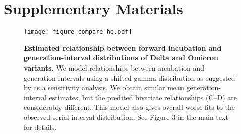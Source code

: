 \documentclass[12pt]{article}
\begin{document}
\pagebreak

\section*{Supplementary Materials}

\begin{figure}[!th]
\texttt{[image: figure\_compare\_he.pdf]}
\caption{
\textbf{Estimated relationship between forward incubation and generation-interval distributions of Delta and Omicron variants.}
We model relationships between incubation and generation intervals using a shifted gamma distribution as suggested by \cite{he2020temporal} as a sensitivity analysis.
We obtain similar mean generation-interval estimates, but the predited bivariate relationships (C--D) are considerably different.
This model also gives overall worse fits to the observed serial-interval distribution.
See Figure 3 in the main text for details.
}
\end{figure}


\end{document}
